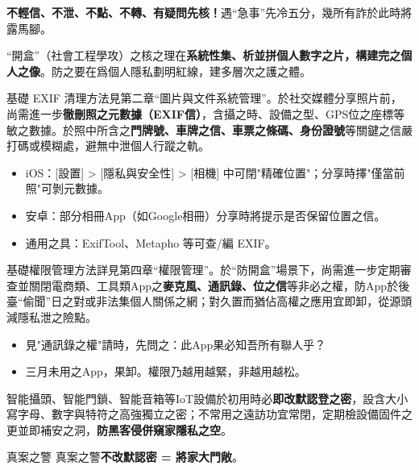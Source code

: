 
\textbf{不輕信、不泄、不點、不轉、有疑問先核！}遇“急事”先冷五分，幾所有詐於此時將露馬腳。


“開盒”（社會工程學攻）之核之理在\textbf{系統性集、析並拼個人數字之片，構建完之個人之像}。防之要在爲個人隱私劃明紅線，建多層次之護之體。


基礎 EXIF 清理方法見第二章“圖片與文件系統管理”。於社交媒體分享照片前，尚需進一步\textbf{徹刪照之元數據（EXIF信）}，含攝之時、設備之型、GPS位之座標等敏之數據。於照中所含之\textbf{門牌號、車牌之信、車票之條碼、身份證號}等關鍵之信嚴打碼或模糊處，避無中泄個人行蹤之軌。

\begin{itemize}
  \item iOS：[設置] > [隱私與安全性] > [相機] 中可閉"精確位置"；分享時擇"僅當前照"可剝元數據。
  \item 安卓：部分相冊App（如Google相冊）分享時將提示是否保留位置之信。
  \item 通用之具：ExifTool、Metapho 等可查/編 EXIF。
\end{itemize}


基礎權限管理方法詳見第四章“權限管理”。於“防開盒”場景下，尚需進一步定期審查並關閉電商類、工具類App之\textbf{麥克風、通訊錄、位之信}等非必之權，防App於後臺“偷聞”日之對或非法集個人關係之網；對久置而猶佔高權之應用宜即卸，從源頭減隱私泄之險點。

\begin{itemize}
  \item 見"通訊錄之權"請時，先問之：此App果必知吾所有聯人乎？
  \item 三月未用之App，果卸。權限乃越用越緊，非越用越松。
\end{itemize}


智能攝頭、智能門鎖、智能音箱等IoT設備於初用時必\textbf{即改默認登之密}，設含大小寫字母、數字與特符之高強獨立之密；不常用之遠訪功宜常閉，定期檢設備固件之更並即補安之洞，\textbf{防黑客侵併窺家隱私之空}。

\begin{tcbwarn}{真案之警}
真案之警\textbf{不改默認密 = 將家大門敞}。

\end{tcbwarn}

